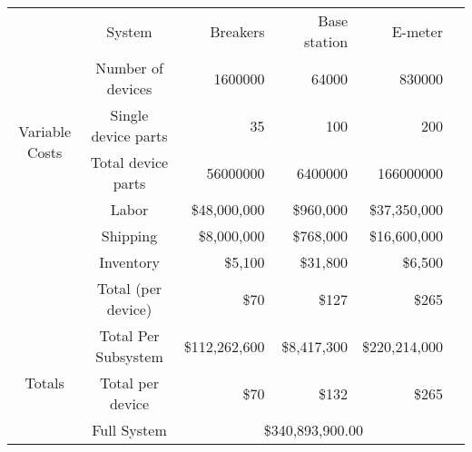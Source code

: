 {\begin{longtable}[c]{|c|c|r|r|r|r|}
\multirow{7}{*}{Variable Costs}  & System                & Breakers  & Base station & E-meter                  \\\cline{2-5}
               & Number of devices     & 1600000   & 64000        & 830000                   \\\cline{2-5}
               & Single device parts   & 35        & 100          & 200                      \\\cline{2-5}
               & Total device parts    & 56000000  & 6400000      & 166000000               \\\cline{2-5}
               & Labor                 & \$48,000,000  & \$960,000       & \$37,350,000                 \\\cline{2-5}
               & Shipping              & \$8,000,000   & \$768,000       & \$16,600,000                 \\\cline{2-5}
               & Inventory             & \$5,100      & \$31,800        & \$6,500                     \\\cline{2-5}
               & Total (per device)& \$70        & \$127          & \$265        \\\hline\hline
\multirow{3}{*}{Totals}         & Total Per Subsystem & \$112,262,600 & \$8,417,300     & \$220,214,000                \\\cline{2-5}
               & Total per device      & \$70        & \$132          & \$265                      \\\cline{2-5}
               & Full System           & \multicolumn{3}{c|}{\$340,893,900.00}    \\\hline
\end{longtable}
}

